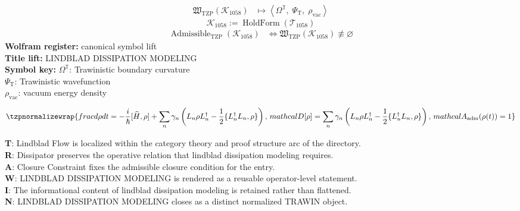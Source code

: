 \noindent
\begin{minipage}[t]{0.48\linewidth}
\begingroup
\small
\[
\begin{aligned}
\mathfrak{W}_{\mathrm{TZP}}\!\left(\mathcal{K}_{1058}\right)
&\longmapsto
\left\langle \Omega^{\mathbb{T}},\; \Psi_{\mathrm{T}},\; \rho_{\mathrm{vac}} \right\rangle
\end{aligned}
\]
\[
\mathcal{K}_{1058}
:=
\operatorname{HoldForm}\!\left(\mathcal{T}_{1058}\right)
\]
\[
\begin{aligned}
\operatorname{Admissible}_{\mathrm{TZP}}\!\left(\mathcal{K}_{1058}\right)
&\Longleftrightarrow
\mathfrak{W}_{\mathrm{TZP}}\!\left(\mathcal{K}_{1058}\right)\not\equiv\varnothing
\end{aligned}
\]
\textbf{Wolfram register:} canonical symbol lift\\
\textbf{Title lift:} LINDBLAD DISSIPATION MODELING\\
\textbf{Symbol key:} \(\Omega^{\mathbb{T}}\): Trawinistic boundary curvature\\ \(\Psi_{\mathrm{T}}\): Trawinistic wavefunction\\ \(\rho_{\mathrm{vac}}\): vacuum energy density
\par
\endgroup
\end{minipage}\hfill
\begin{minipage}[t]{0.48\linewidth}
\[
\tzpnormalizewrap{frac{d\rho}{dt}=-\frac{i}{\hbar}[\widehat{H},\rho]+\sum_{n}\gamma_{n}\left(L_{n}\rho L_{n}^{\dagger}-\frac{1}{2}\{L_{n}^{\dagger}L_{n},\rho\}\right),\,mathcal{D}[\rho]=\sum_{n}\gamma_{n}\left(L_{n}\rho L_{n}^{\dagger}-\frac{1}{2}\{L_{n}^{\dagger}L_{n},\rho\}\right),\,mathcal{A}_{\mathrm{adm}}\!\left(\rho(t)\right)=1}
\]

\small
\textbf{T}: Lindblad Flow is localized within the category theory and proof structure arc of the directory.\\
\textbf{R}: Dissipator preserves the operative relation that lindblad dissipation modeling requires.\\
\textbf{A}: Closure Constraint fixes the admissible closure condition for the entry.\\
\textbf{W}: LINDBLAD DISSIPATION MODELING is rendered as a reusable operator-level statement.\\
\textbf{I}: The informational content of lindblad dissipation modeling is retained rather than flattened.\\
\textbf{N}: LINDBLAD DISSIPATION MODELING closes as a distinct normalized TRAWIN object.
\normalsize
\end{minipage}

